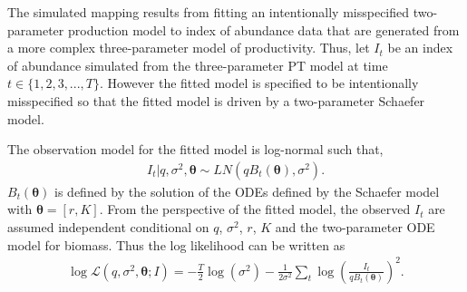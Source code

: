 %
The simulated mapping results from fitting an intentionally misspecified 
two-parameter production model to index of abundance data that are generated from
a more complex three-parameter model of productivity.
Thus, let $I_t$ be an index of abundance simulated from the three-parameter PT model
at time $t\in\{1,2, 3,..., T\}$. However the
fitted model is specified to be intentionally misspecified so that the fitted
model is driven by a two-parameter Schaefer model. %

%
The observation model for the fitted model is log-normal such that,
%
\begin{align}
I_t| q, \sigma^2, \bm{\theta} \sim LN(qB_t(\bm{\theta}), \sigma^2).
\end{align}
%
$B_t(\bm{\theta})$ is defined by the solution of the ODEs defined by the Schaefer model with $\bm{\theta}=[r, K]$. %
%
%
From the perspective of the fitted model, the observed $I_t$ are assumed independent
conditional on $q$, $\sigma^2$, $r$, $K$ and the two-parameter ODE model for biomass.
Thus the log likelihood can be written as
%
\begin{align}
\log\mathcal{L}(q, \sigma^2, \bm{\theta}; I) = - \frac{T}{2}\log(\sigma^2) - \frac{1}{2\sigma^2}\sum_t \log\left(\frac{I_t}{qB_t(\bm{\theta})}\right)^2. \label{logLike}
\end{align}

